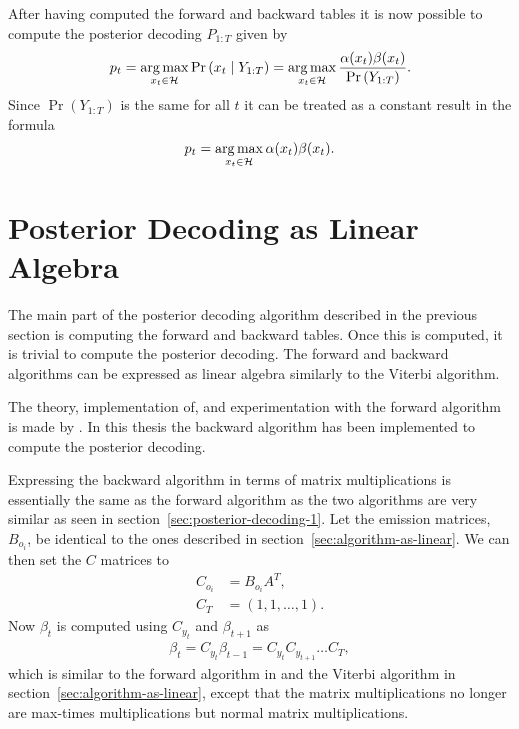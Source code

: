After having computed the forward and backward tables it is now possible to
compute the posterior decoding $P_{1:T}$ given by
\begin{equation*}
  p_t = \operatorname*{arg\,max}_{x_t \in \mathcal{H}} \Pr \left(x_t \mid Y_{1:T} \right) =
  \operatorname*{arg\,max}_{x_t \in \mathcal{H}} \frac{\alpha(x_t) \beta(x_t)}{\Pr \left( Y_{1:T} \right)}.
\end{equation*}
Since $\Pr ( Y_{1:T} )$ is the same for all $t$ it can be treated as
a constant result in the formula
\begin{equation}
  \label{eq:6}
  p_t = \operatorname*{arg\,max}_{x_t \in \mathcal{H}} \alpha(x_t) \beta(x_t).
\end{equation}

\section{Posterior Decoding as Linear Algebra}

The main part of the posterior decoding algorithm described in the previous
section is computing the forward and backward tables. Once this is computed, it is
trivial to compute the posterior decoding. The forward and backward algorithms can
be expressed as linear algebra similarly to the Viterbi algorithm.

The theory, implementation of, and experimentation with the forward algorithm
is made by \citet{sand2013ziphmmlib}. In this thesis the backward algorithm has
been implemented to compute the posterior decoding.

Expressing the backward algorithm in terms of matrix multiplications is
essentially the same as the forward algorithm as the two algorithms are very
similar as seen in section~\ref{sec:posterior-decoding-1}. Let the emission
matrices, $B_{o_i}$, be identical to the ones described in
section~\ref{sec:algorithm-as-linear}. We can then set the $C$ matrices to
\begin{equation}
  \label{eq:4}
  \begin{aligned}
    C_{o_i} & = B_{o_i} A^T, \\
    C_T & = (1, 1, \dots, 1).
  \end{aligned}
\end{equation}
Now $\beta_t$ is computed using $C_{y_t}$ and $\beta_{t + 1}$ as
\begin{equation}
  \label{eq:5}
  \begin{aligned}
    \beta_t = C_{y_t} \beta_{t - 1} = C_{y_t} C_{y_{t+1}}\dots C_T,
  \end{aligned}
\end{equation}
which is similar to the forward algorithm in \citet{sand2013ziphmmlib} and the
Viterbi algorithm in section~\ref{sec:algorithm-as-linear}, except that the
matrix multiplications no longer are max-times multiplications but normal
matrix multiplications.

